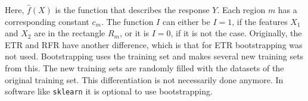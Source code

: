 	Here, $\hat{f}(X)$ is the function that describes the response $Y$.
	Each region $m$ has a corresponding constant $c_m$. The function $I$ can either be $I=1$,
	if the features $X_1$ and $X_2$ are in the rectangle $R_m$, or it is $I=0$, if it is not the case.
	Originally, the ETR and RFR have another difference, which is that for ETR bootstrapping was not used.\supercite{Geurts2006}
	Bootstrapping uses the training set and makes several new training sets from this.
	The new training sets are randomly filled with the datasets of the original training set.\supercite{Hastie2009}
	This differentiation is not necessarily done anymore.
	In software like \texttt{sklearn}\supercite{scikit-learn} it is optional to use bootstrapping.
